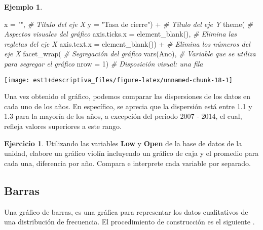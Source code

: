 \documentclass[
]{book}
\newenvironment{Shaded}{\begin{snugshade}}{\end{snugshade}}
\newcommand{\AttributeTok}[1]{\textcolor[rgb]{0.77,0.63,0.00}{#1}}
\newcommand{\CommentTok}[1]{\textcolor[rgb]{0.56,0.35,0.01}{\textit{#1}}}
\newcommand{\DecValTok}[1]{\textcolor[rgb]{0.00,0.00,0.81}{#1}}
\newcommand{\FunctionTok}[1]{\textcolor[rgb]{0.00,0.00,0.00}{#1}}
\newcommand{\NormalTok}[1]{#1}
\newcommand{\SpecialCharTok}[1]{\textcolor[rgb]{0.00,0.00,0.00}{#1}}
\newcommand{\StringTok}[1]{\textcolor[rgb]{0.31,0.60,0.02}{#1}}
\theoremstyle{definition}
\theoremstyle{definition}
\newtheorem{example}{Ejemplo}[chapter]
\theoremstyle{definition}
\newtheorem{exercise}{Ejercicio}[chapter]
\theoremstyle{definition}
\theoremstyle{remark}
\begin{document}
\begin{example}
\begin{Shaded}
\begin{Highlighting}[]
    \AttributeTok{x =} \StringTok{""}\NormalTok{, }\CommentTok{\# Título del eje X}
    \AttributeTok{y =} \StringTok{"Tasa de cierre"}\NormalTok{) }\SpecialCharTok{+} \CommentTok{\# Título del eje Y}
  \FunctionTok{theme}\NormalTok{( }\CommentTok{\# Aspectos visuales del gráfico}
    \AttributeTok{axis.ticks.x =} \FunctionTok{element\_blank}\NormalTok{(), }\CommentTok{\# Elimina las regletas del eje X}
    \AttributeTok{axis.text.x =} \FunctionTok{element\_blank}\NormalTok{()) }\SpecialCharTok{+} \CommentTok{\# Elimina los números del eje X}
  \FunctionTok{facet\_wrap}\NormalTok{( }\CommentTok{\# Segregación del gráfico}
    \FunctionTok{vars}\NormalTok{(Ano), }\CommentTok{\# Variable que se utiliza para segregar el gráfico}
    \AttributeTok{nrow =} \DecValTok{1}\NormalTok{) }\CommentTok{\# Disposición visual: una fila}
\end{Highlighting}
\end{Shaded}

\begin{center}\texttt{[image: est1+descriptiva\_files/figure-latex/unnamed-chunk-18-1]} \end{center}

Una vez obtenido el gráfico, podemos comparar las dispersiones de los datos en cada uno de los años. En específico, se aprecia que la dispersión está entre 1.1 y 1.3 para la mayoría de los años, a excepción del periodo 2007 - 2014, el cual, refleja valores superiores a este rango.
\end{example}

\begin{exercise}
Utilizando las variables \textbf{Low} y \textbf{Open} de la base de datos de la unidad, elabore un gráfico violín incluyendo un gráfico de caja y el promedio para cada una, diferencia por año. Compara e interprete cada variable por separado.
\end{exercise}

\hypertarget{barras}{%
\subsection{Barras}\label{barras}}

Una gráfico de barras, es una gráfica para representar los datos cualitativos de una distribución de frecuencia. El procedimiento de construcción es el siguiente \citep[página 29]{anderson}.
\end{document}
